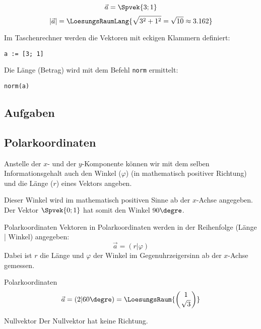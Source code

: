     \begin{beispiel}{}{}
      $$ \vec{a}= \Spvek{3;1}$$
        $$|\vec{a}| = \LoesungsRaumLang{\sqrt{3^2+1^2} = \sqrt{10}\approx 3.162}$$
      \end{beispiel}
    

    \begin{bemerkung}{}{}
      Im Taschenrechner werden die Vektoren mit eckigen Klammern
      definiert:

      \texttt{a := [3; 1]}

      Die Länge (Betrag) wird mit dem Befehl \texttt{norm} ermittelt:

      \texttt{norm(a)}
    \end{bemerkung}
    \subsection*{Aufgaben}
\newpage

\subsection{Polarkoordinaten}


\newpage

Anstelle der $x$- und der $y$-Komponente können wir mit dem selben
Informationsgehalt auch den Winkel ($\varphi$)
(in mathematisch positiver Richtung) und die Länge ($r$) eines Vektors
angeben.


Dieser Winkel wird im mathematisch positiven Sinne ab der $x$-Achse
angegeben. Der Vektor
$\Spvek{0;1}$ hat somit den Winkel $90\degre$.
  \begin{definition}{Polarkoordinaten}{}
    Vektoren in Polarkoordinaten werden in der Reihenfolge (Länge |
    Winkel) angegeben:
    $$\vec{a} = (r | \varphi)$$
    Dabei ist $r$ die Länge und $\varphi$ der Winkel im
    Gegenuhrzeigersinn ab der $x$-Achse gemessen.
  \end{definition}

  \begin{beispiel}{Polarkoordinaten}{}
    $$\vec{a} = (2 | 60\degre) = \LoesungsRaum{\left(1\atop \sqrt{3}\right)}$$
  \end{beispiel}
  
  \begin{bemerkung}{Nullvektor}{}
    Der Nullvektor hat keine Richtung.
    \end{bemerkung}
  \newpage
  
